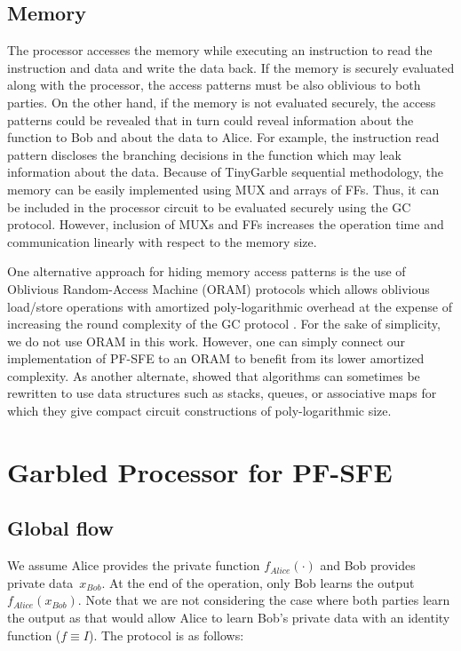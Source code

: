\subsection{Memory}\label{ssec:processor-mem}
The processor accesses the memory while executing an instruction to read the instruction and data and write the data back.
If the memory is securely evaluated along with the processor, the access patterns must be also oblivious to both parties.
On the other hand, if the memory is not evaluated securely, the access patterns could be revealed that in turn could reveal information about the function to Bob and about the data to Alice.
For example, the instruction read pattern discloses the branching decisions in the function which may leak information about the data.
Because of TinyGarble sequential methodology, the memory can be easily implemented using MUX and arrays of FFs.
Thus, it can be included in the processor circuit to be evaluated securely using the GC protocol.
However, inclusion of MUXs and FFs increases the operation time and communication linearly with respect to the memory size.

One alternative approach for hiding memory access patterns is the use of Oblivious Random-Access Machine (ORAM) protocols \cite{goldreich1996software} which allows oblivious load/store operations with amortized poly-logarithmic overhead at the expense of increasing the round complexity of the GC protocol \cite{gordon2012secure,liu2014automating,lu2013garble,gentry2014garbled}.
For the sake of simplicity, we do not use ORAM in this work.
However, one can simply connect our implementation of PF-SFE to an ORAM to benefit from its lower amortized complexity.
As another alternate, \cite{zahur2013circuit} showed that algorithms can sometimes be rewritten to use data structures such as stacks, queues, or associative maps for which they give compact circuit constructions of poly-logarithmic size.

\section{Garbled Processor for PF-SFE}\label{sec:processor-pro-pfsfe}
\subsection{Global flow}\label{ssec:processor-mips-flow}
We assume Alice provides the private function $f_{Alice}(\cdot)$ and Bob provides private data~$x_{Bob}$.
At the end of the operation, only Bob learns the output $f_{Alice}(x_{Bob})$.
Note that we are not considering the case where both parties learn the output as that would allow Alice to learn Bob's private data with an identity function ($f\equiv I$).
The protocol is as follows:

